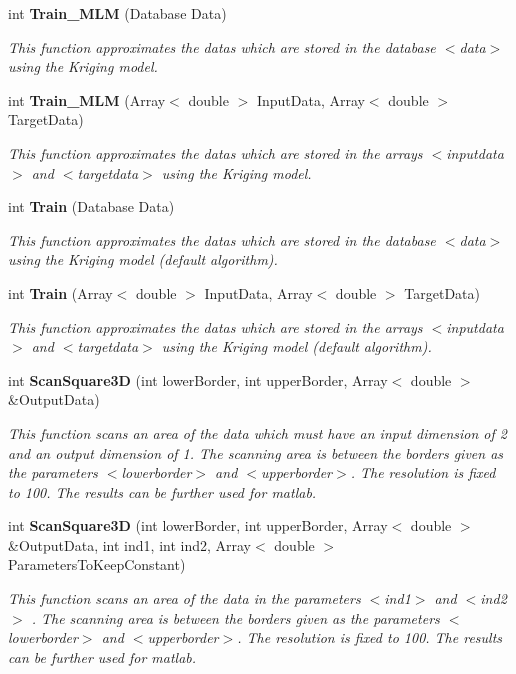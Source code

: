 \begin{CompactItemize}
int {\bf Train\_\-MLM} (Database Data)
\begin{CompactList}\small\item\em This function approximates the datas which are stored in the database $<$data$>$ using the Kriging model. \item\end{CompactList}\item 
int {\bf Train\_\-MLM} (Array$<$ double $>$ Input\-Data, Array$<$ double $>$ Target\-Data)
\begin{CompactList}\small\item\em This function approximates the datas which are stored in the arrays $<$inputdata$>$ and $<$targetdata$>$ using the Kriging model. \item\end{CompactList}\item 
int {\bf Train} (Database Data)
\begin{CompactList}\small\item\em This function approximates the datas which are stored in the database $<$data$>$ using the Kriging model (default algorithm). \item\end{CompactList}\item 
int {\bf Train} (Array$<$ double $>$ Input\-Data, Array$<$ double $>$ Target\-Data)
\begin{CompactList}\small\item\em This function approximates the datas which are stored in the arrays $<$inputdata$>$ and $<$targetdata$>$ using the Kriging model (default algorithm). \item\end{CompactList}\item 
int {\bf Scan\-Square3D} (int lower\-Border, int upper\-Border, Array$<$ double $>$ \&Output\-Data)
\begin{CompactList}\small\item\em This function scans an area of the data which must have an input dimension of 2 and an output dimension of 1. The scanning area is between the borders given as the parameters $<$lowerborder$>$ and $<$upperborder$>$. The resolution is fixed to 100. The results can be further used for matlab. \item\end{CompactList}\item 
int {\bf Scan\-Square3D} (int lower\-Border, int upper\-Border, Array$<$ double $>$ \&Output\-Data, int ind1, int ind2, Array$<$ double $>$ Parameters\-To\-Keep\-Constant)
\begin{CompactList}\small\item\em This function scans an area of the data in the parameters $<$ind1$>$ and $<$ind2$>$ . The scanning area is between the borders given as the parameters $<$lowerborder$>$ and $<$upperborder$>$. The resolution is fixed to 100. The results can be further used for matlab. \item\end{CompactList}\end{CompactItemize}


